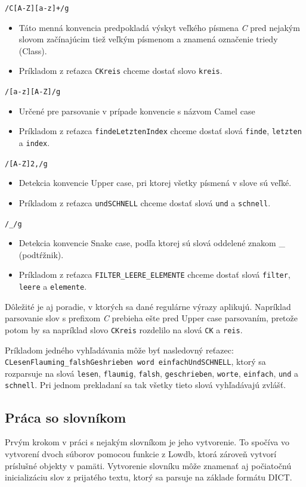 \documentclass[
  digital, %
  table,   %
  lof,     %
  lot,     %
]{fithesis3}
\begin{document}
\noindent
\texttt{/C[A-Z][a-z]+/g}
\begin{itemize}
\item Táto menná konvencia predpokladá výskyt veľkého písmena \textit{C} pred nejakým slovom začínajúcim tiež veľkým písmenom a znamená označenie triedy (Class).
\item Príkladom z reťazca \texttt{CKreis} chceme dostať slovo \texttt{kreis}.
\end{itemize}

\noindent
\texttt{/[a-z][A-Z]/g}
\begin{itemize}
\item Určené pre parsovanie v prípade konvencie s názvom Camel case
\item Príkladom z reťazca \texttt{findeLetztenIndex} chceme dostať slová \texttt{finde}, \texttt{letzten} a \texttt{index}.
\end{itemize}

\noindent
\texttt{/[A-Z]{2,}/g}
\begin{itemize}
\item Detekcia konvencie Upper case, pri ktorej všetky písmená v slove sú veľké.
\item Príkladom z reťazca \texttt{undSCHNELL} chceme dostať slová \texttt{und} a \texttt{schnell}.
\end{itemize}

\noindent
\texttt{/\_/g}
\begin{itemize}
\item Detekcia konvencie Snake case, podľa ktorej sú slová oddelené znakom \_ (podtŕžnik).
\item Príkladom z reťazca \texttt{FILTER\_LEERE\_ELEMENTE} chceme dostať slová \texttt{filter}, \texttt{leere} a \texttt{elemente}.
\end{itemize}

Dôležité je aj poradie, v ktorých sa dané regulárne výrazy aplikujú. Napríklad parsovanie slov s prefixom \textit{C} prebieha ešte pred Upper case parsovaním, pretože potom by sa napríklad slovo \texttt{CKreis} rozdelilo na slová \texttt{CK} a \texttt{reis}.

Príkladom jedného vyhľadávania môže byť nasledovný reťazec: \texttt{CLesenFlauming\_falshGeshrieben word einfachUndSCHNELL}, ktorý sa rozparsuje na slová \texttt{lesen}, \texttt{flaumig}, \texttt{falsh}, \texttt{geschrieben}, \texttt{worte}, \texttt{einfach}, \texttt{und} a \texttt{schnell}. Pri jednom prekladaní sa tak všetky tieto slová vyhľadávajú zvlášť.

\subsection{Práca so slovníkom}
Prvým krokom v práci s nejakým slovníkom je jeho vytvorenie. To spočíva vo vytvorení dvoch súborov pomocou funkcie z Lowdb, ktorá zároveň vytvorí príslušné objekty v pamäti. Vytvorenie slovníku môže znamenať aj počiatočnú inicializáciu slov z prijatého textu, ktorý sa parsuje na základe formátu DICT.
\end{document}
